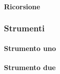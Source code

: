  \paragraph{Ricorsione}

\subsubsection{Strumenti}
  \paragraph{Strumento uno}

 \paragraph{Strumento due}



  
